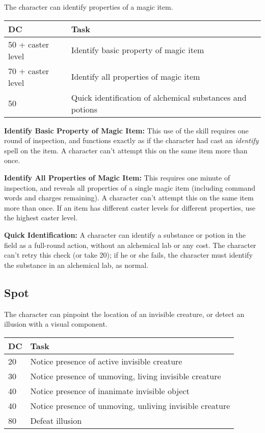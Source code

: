 \documentclass{article}
\begin{document}
The character can identify properties of a magic item. 

\begin{tabular}{|>{\raggedright}p{64pt}|>{\raggedright}p{229pt}|}
\hline
D\textbf{C } & T\textbf{ask }\tabularnewline
\hline
50 + caster level  & Identify basic property of magic item \tabularnewline
\hline
70 + caster level  & Identify all properties of magic item \tabularnewline
\hline
50 & Quick identification of alchemical substances and potions\tabularnewline
\hline
\end{tabular}

\textbf{Identify Basic Property of Magic Item:} This use of the skill requires 
one round of inspection, and functions exactly as if the character had cast an 
\textit{identify }spell on the item. A character can't attempt this on the same 
item more than once. 

\textbf{Identify All Properties of Magic Item:}\textit{ }This requires one minute 
of inspection, and reveals all properties of a single magic item (including command 
words and charges remaining). A character can't attempt this on the same item more 
than once. If an item has different caster levels for different properties, use 
the highest caster level. 

\textbf{Quick Identification: }A character can identify a substance or potion in 
the field as a full-round action, without an alchemical lab or any cost. The character 
can't retry this check (or take 20); if he or she fails, the character must identify 
the substance in an alchemical lab, as normal. 

\vspace{12pt}
\subsection*{Spot }

The character can pinpoint the location of an invisible creature, or detect an 
illusion with a visual component. 

\begin{tabular}{|>{\raggedright}p{13pt}|>{\raggedright}p{226pt}|}
\hline
D\textbf{C } & T\textbf{ask }\tabularnewline
\hline
20  & Notice presence of active invisible creature \tabularnewline
\hline
30  & Notice presence of unmoving, living invisible creature \tabularnewline
\hline
40  & Notice presence of inanimate invisible object \tabularnewline
\hline
40  & Notice presence of unmoving, unliving invisible creature \tabularnewline
\hline
80  & Defeat illusion \tabularnewline
\hline
\end{tabular}
\end{document}
